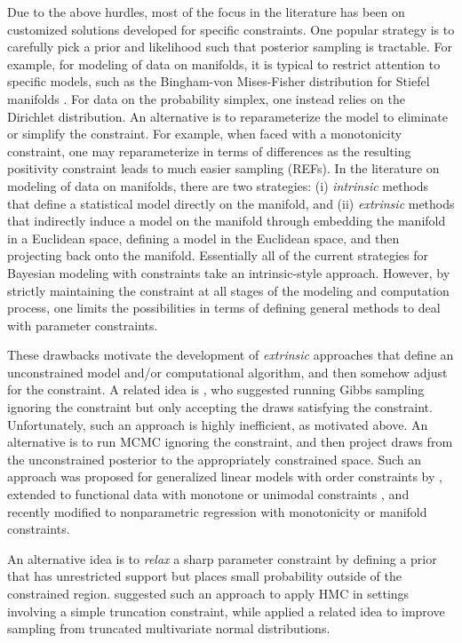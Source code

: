 \documentclass[10pt]{article}
\DeclareMathOperator{\1}{\mathbbm{1}}
\begin{document}
Due to the above hurdles, most of the focus in the literature has been on customized solutions developed for specific constraints.
One popular strategy is to carefully pick a prior and likelihood such that posterior sampling is tractable. For example, for modeling of data on manifolds, it is typical to restrict attention to specific models, such as the Bingham-von Mises-Fisher distribution for Stiefel manifolds \citep{khatri1977mises,hoff2009simulation}. For data on the probability simplex, one instead relies on the Dirichlet distribution. An alternative is to reparameterize the model to eliminate or simplify the constraint. For example, when faced with a monotonicity constraint, one may reparameterize in terms of differences as the resulting positivity constraint leads to much easier sampling (REFs). In the literature on modeling of data on manifolds, there are two strategies: (i) {\em intrinsic} methods that define a statistical model directly on the manifold, and (ii) {\em extrinsic} methods that indirectly induce a model on the manifold through embedding the manifold in a Euclidean space, defining a model in the Euclidean space, and then projecting back onto the manifold. Essentially all of the current strategies for Bayesian modeling with constraints take an intrinsic-style approach. However, by strictly maintaining the constraint at all stages of the modeling and computation process, one limits the possibilities in terms of defining general methods to deal with parameter constraints.

These drawbacks motivate the development of {\em extrinsic} approaches that define an unconstrained model and/or computational algorithm, and then somehow adjust for the constraint. A related idea is \cite{gelfand1992bayesian}, who suggested running Gibbs sampling ignoring the constraint but only accepting the draws satisfying the constraint. Unfortunately, such an approach is highly inefficient, as motivated above. An alternative is to run MCMC ignoring the constraint, and then project draws from the unconstrained posterior to the appropriately constrained space. Such an approach was proposed for generalized linear models with order constraints by \cite{dunson2003bayesian}, extended to functional data with monotone or unimodal constraints \cite{gunn2005transformation}, and recently modified to nonparametric regression with monotonicity \cite{lin2014monogp} or manifold \cite{lin2016extrinsic} constraints.

An alternative idea is to {\em relax} a sharp parameter constraint by defining a prior that has unrestricted support but places small probability outside of the constrained region. \cite{neal2011mcmc} suggested such an approach to apply HMC in settings involving a simple truncation constraint, while \cite{pakman2014exact} applied a related idea to improve sampling from truncated multivariate normal distributions.
\end{document}
